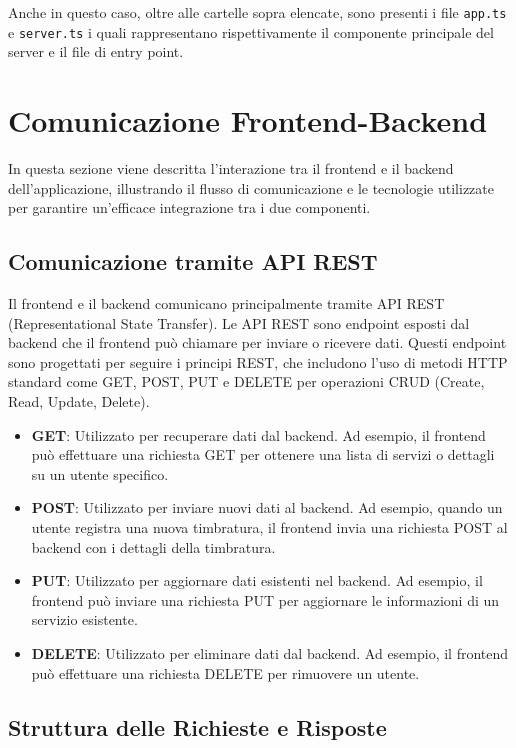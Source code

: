 \documentclass[twoside]{supsistudent}
\begin{document}
Anche in questo caso, oltre alle cartelle sopra elencate, sono presenti i file \texttt{app.ts} e \texttt{server.ts} i quali rappresentano rispettivamente il componente principale del server e il file di entry point.

\section{Comunicazione Frontend-Backend}
In questa sezione viene descritta l'interazione tra il frontend e il backend dell'applicazione, illustrando il flusso di comunicazione e le tecnologie utilizzate per garantire un'efficace integrazione tra i due componenti.

\subsection{Comunicazione tramite API REST}

Il frontend e il backend comunicano principalmente tramite API REST (Representational State Transfer). Le API REST sono endpoint esposti dal backend che il frontend può chiamare per inviare o ricevere dati. Questi endpoint sono progettati per seguire i principi REST, che includono l'uso di metodi HTTP standard come GET, POST, PUT e DELETE per operazioni CRUD (Create, Read, Update, Delete).

\begin{itemize}
  \item \textbf{GET}: Utilizzato per recuperare dati dal backend. Ad esempio, il frontend può effettuare una richiesta GET per ottenere una lista di servizi o dettagli su un utente specifico.
  \item \textbf{POST}: Utilizzato per inviare nuovi dati al backend. Ad esempio, quando un utente registra una nuova timbratura, il frontend invia una richiesta POST al backend con i dettagli della timbratura.
  \item \textbf{PUT}: Utilizzato per aggiornare dati esistenti nel backend. Ad esempio, il frontend può inviare una richiesta PUT per aggiornare le informazioni di un servizio esistente.
  \item \textbf{DELETE}: Utilizzato per eliminare dati dal backend. Ad esempio, il frontend può effettuare una richiesta DELETE per rimuovere un utente.
\end{itemize}

\subsection{Struttura delle Richieste e Risposte}
\end{document}
